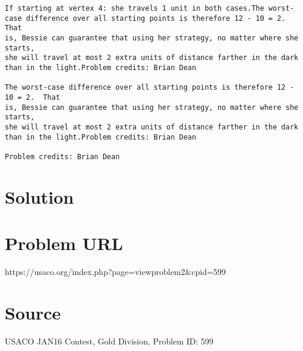 \documentclass[12pt]{article}
\begin{document}
\begin{verbatim}
If starting at vertex 4: she travels 1 unit in both cases.The worst-case difference over all starting points is therefore 12 - 10 = 2.  That
is, Bessie can guarantee that using her strategy, no matter where she starts,
she will travel at most 2 extra units of distance farther in the dark than in the light.Problem credits: Brian Dean

The worst-case difference over all starting points is therefore 12 - 10 = 2.  That
is, Bessie can guarantee that using her strategy, no matter where she starts,
she will travel at most 2 extra units of distance farther in the dark than in the light.Problem credits: Brian Dean

Problem credits: Brian Dean
\end{verbatim}

\section*{Solution}


\section*{Problem URL}
https://usaco.org/index.php?page=viewproblem2&cpid=599

\section*{Source}
USACO JAN16 Contest, Gold Division, Problem ID: 599
\end{document}
